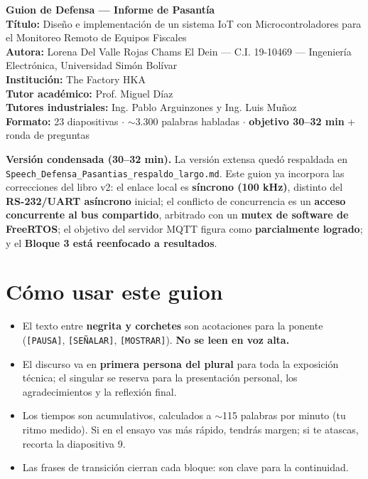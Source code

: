 \documentclass[11pt, a4paper]{article}
\begin{document}
\begin{center}
    {\LARGE \textbf{Guion de Defensa — Informe de Pasantía}}\\[1.5em]
    {\Large \textbf{Título:} Diseño e implementación de un sistema IoT con Microcontroladores para el Monitoreo Remoto de Equipos Fiscales}\\[1em]
    \textbf{Autora:} Lorena Del Valle Rojas Chams El Dein — C.I. 19-10469 — Ingeniería Electrónica, Universidad Simón Bolívar\\
    \textbf{Institución:} The Factory HKA\\
    \textbf{Tutor académico:} Prof. Miguel Díaz\\
    \textbf{Tutores industriales:} Ing. Pablo Arguinzones y Ing. Luis Muñoz\\
    \textbf{Formato:} 23 diapositivas $\cdot$ $\sim$3.300 palabras habladas $\cdot$ \textbf{objetivo 30–32 min} + ronda de preguntas
\end{center}

\vspace{1em}

\begin{guionquote}
\textbf{Versión condensada (30–32 min).} La versión extensa quedó respaldada en \texttt{Speech\_Defensa\_Pasantias\_respaldo\_largo.md}. Este guion ya incorpora las correcciones del libro v2: el enlace local es \textbf{síncrono (100 kHz)}, distinto del \textbf{RS-232/UART asíncrono} inicial; el conflicto de concurrencia es un \textbf{acceso concurrente al bus compartido}, arbitrado con un \textbf{mutex de software de FreeRTOS}; el objetivo del servidor MQTT figura como \textbf{parcialmente logrado}; y el \textbf{Bloque 3 está reenfocado a resultados}.
\end{guionquote}

\section*{Cómo usar este guion}

\begin{itemize}[label=-]
    \item El texto entre \textbf{negrita y corchetes} son acotaciones para la ponente (\texttt{[PAUSA]}, \texttt{[SEÑALAR]}, \texttt{[MOSTRAR]}). \textbf{No se leen en voz alta.}
    \item El discurso va en \textbf{primera persona del plural} para toda la exposición técnica; el singular se reserva para la presentación personal, los agradecimientos y la reflexión final.
    \item Los tiempos son acumulativos, calculados a $\sim$115 palabras por minuto (tu ritmo medido). Si en el ensayo vas más rápido, tendrás margen; si te atascas, recorta la diapositiva 9.
    \item Las frases de transición cierran cada bloque: son clave para la continuidad.
\end{itemize}
\end{document}
